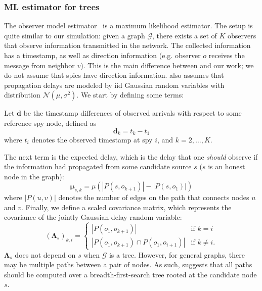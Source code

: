 \subsubsection{ML estimator for trees}
The observer model estimator~\cite{pinto} is a maximum likelihood estimator. The setup is quite similar to our simulation: given a graph $\mathcal G$, there exists a set of $K$ observers that observe information transmitted in the network. The collected information has a timestamp, as well as direction information (e.g. observer $o$ receives the message from neighbor $v$). This is the main difference between \cite{pinto} and our work; we do not assume that spies have direction information. \cite{pinto} also assumes that propagation delays are modeled by iid Gaussian random variables with distribution $\mathcal N(\mu,\sigma^2)$. We start by defining some terms:

Let $\boldsymbol{d}$ be the timestamp differences of observed arrivals with respect to some reference spy node, defined as
\begin{equation}
  \boldsymbol{d}_k = t_{k} - t_1
\end{equation}
where $t_i$ denotes the observed timestamp at spy $i$, and $k = 2,\ldots, K$.

The next term is the expected delay, which is the delay that one \emph{should} observe if the information had propagated from some candidate source $s$ ($s$ is an honest node in the graph):
\begin{equation}
  \boldsymbol{\mu}_{s,k} = \mu (|P(s, o_{k+1})| - |P(s, o_1)|)
\end{equation}
where $|P(u, v)|$ denotes the number of edges on the path that connects nodes $u$ and $v$. Finally, we define a scaled covariance matrix, which represents the covariance of the jointly-Gaussian delay random variable:
\begin{equation}
  (\boldsymbol{\Lambda}_s)_{k, i} = \begin{cases}
    |P(o_1, o_{k+1})| & \text{if $k = i$} \\
    |P(o_1, o_{k+1}) \cap P(o_1, o_{i+1})| & \text{if $k \neq i$}.
  \end{cases}
\end{equation}
$\boldsymbol \Lambda_s$ does not depend on $s$ when $\mathcal G$ is a tree. However, for general graphs, there may be multiple paths between a pair of nodes. As such, \cite{pinto} suggests that all paths should be computed over a breadth-first-search tree rooted at the candidate node $s$.

